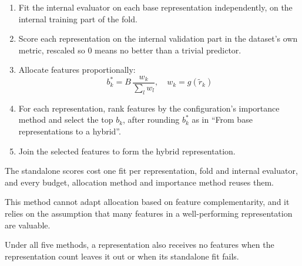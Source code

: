 \begin{enumerate}
    \item Fit the internal evaluator on each base representation independently, on the internal training part of the fold.
    \item Score each representation on the internal validation part in the dataset's own metric, rescaled so 0 means no better than a trivial predictor.
    \item Allocate features proportionally:
    \[
    b^*_k = B \, \frac{w_k}{\sum_{l} w_l}, \quad w_k = g(\tilde r_k) %
    \]
    \item For each representation, rank features by the configuration's importance method and select the top $b_k$, after rounding $b^*_k$ as in ``From base representations to a hybrid''.
    \item Join the selected features to form the hybrid representation.
\end{enumerate}

The standalone scores cost one fit per representation, fold and internal evaluator, and every budget, allocation method and importance method reuses them.

This method cannot adapt allocation based on feature complementarity, and it relies on the assumption that many features in a well-performing representation are valuable.

Under all five methods, a representation also receives no features when the representation count leaves it out or when its standalone fit fails.

